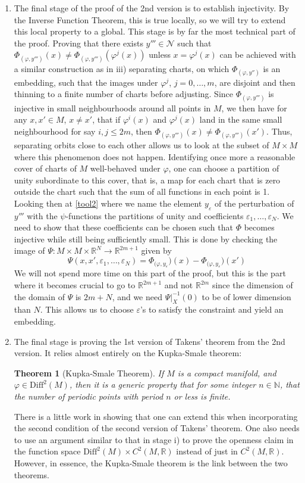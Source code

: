 \documentclass[11pt, a4paper]{memoir}
\theoremstyle{break}
\newtheorem{thm}{Theorem}
\theoremstyle{break}
\theoremstyle{nonumberplain}
\newcommand{\mN}{\mathbb{N}}
\newcommand{\mR}{\mathbb{R}}
\begin{document}
\begin{enumerate}[label=\roman*)]
	\item The final stage of the proof of the 2nd version is to establish injectivity. By the Inverse Function Theorem, this is true locally, so we will try to extend this local property to a global. This stage is by far the most technical part of the proof. Proving that there exists $y'''\in \mathcal{N}$ such that $\Phi_{(\varphi, y''')}(x)\neq \Phi_{(\varphi, y''')}(\varphi^j(x))$ unless $x=\varphi^j(x)$ can be achieved with a similar construction as in iii) separating charts, on which $\Phi_{(\varphi,y'')}$ is an embedding, such that the images under $\varphi^j$, $j=0,\ldots,m$, are disjoint and then thinning to a finite number of charts before adjusting. Since $\Phi_{(\varphi,y''')}$ is injective in small neighbourhoods around all points in $M$, we then have for any $x,x'\in M$, $x\neq x'$, that if $\varphi^i(x)$ and $\varphi^j(x)$ land in the same small neighbourhood for say $i,j\leqslant 2m$, then $\Phi_{(\varphi,y''')}(x)\neq \Phi _{(\varphi,y''')}(x')$. Thus, separating orbits close to each other allows us to look at the subset of $M\times M$ where this phenomenon does not happen. Identifying once more a reasonable cover of charts of $M$ well-behaved under $\varphi$, one can choose a partition of unity subordinate to this cover, that is, a map for each chart that is zero outside the chart such that the sum of all functions in each point is 1. Looking then at \ref{tool2} where we name the element $y_{\varepsilon}$ of the perturbation of $y'''$ with the $\psi$-functions the partitions of unity and coefficients $\varepsilon_1,\ldots,\varepsilon_N$. We need to show that these coefficients can be chosen such that $\Phi$ becomes injective while still being sufficiently small. This is done by checking the image of $\Psi:M\times M\times \mR^N\to\mR^{2m+1}$ given by
	$$\Psi(x,x',\varepsilon_1,\ldots,\varepsilon_N)=\Phi_{(\varphi,y_{\varepsilon}})(x)-\Phi_{(\varphi,y_{\varepsilon}})(x')$$
	We will not spend more time on this part of the proof, but this is the part where it becomes crucial to go to $\mR^{2m+1}$ and not $\mR^{2m}$ since the dimension of the domain of $\Psi$ is $2m+N$, and we need $\Psi|_{X}^{-1}(0)$ to be of lower dimension than $N$. This allows us to choose $\varepsilon$'s to satisfy the constraint and yield an embedding. 
	\item The final stage is proving the 1st version of Takens' theorem from the 2nd version. It relies almost entirely on the Kupka-Smale theorem:
	\begin{thm}[Kupka-Smale Theorem]
	If $M$ is a compact manifold, and $\varphi\in \text{Diff}^2(M)$, then it is a generic property that for some integer $n\in \mN$, that the number of periodic points with period $n$ or less is finite.
	\end{thm}
	There is a little work in showing that one can extend this when incorporating the second condition of the second version of Takens' theorem. One also needs to use an argument similar to that in stage i) to prove the openness claim in the function space $\text{Diff}^2(M)\times C^2(M,\mR)$ instead of just in $C^2(M,\mR)$. However, in essence, the Kupka-Smale theorem is the link between the two theorems.
\end{enumerate}  
\end{document}
